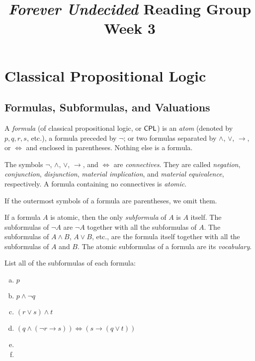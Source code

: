 \documentclass{article}
\title{\textit{Forever Undecided} Reading Group \\ Week 3}
\date{}
\author{}
\begin{document}
\maketitle

\section*{Classical Propositional Logic}

\subsection*{Formulas, Subformulas, and Valuations}

\begin{definition}
    A \textit{formula} (of classical propositional logic, or $\mathsf{CPL}$) is an \textit{atom} (denoted by $p, q, r, s$, etc.), a formula preceded by $\neg$; or two formulas separated by $\wedge$, $\vee$, $\to$, or $\iff$ and enclosed in parentheses. Nothing else is a formula. 
\end{definition}

\begin{definition}    
    The symbols $\neg$, $\wedge$, $\vee$, $\to$, and $\iff$ are \textit{connectives}. They are called \textit{negation}, \textit{conjunction}, \textit{disjunction}, \textit{material implication}, and \textit{material equivalence}, respectively. A formula containing no connectives is \textit{atomic}.
\end{definition}

\begin{notation}
    If the outermost symbols of a formula are parentheses, we omit them.
\end{notation}

\begin{definition}
    If a formula $A$ is atomic, then the only \textit{subformula} of $A$ is $A$ itself. The subformulas of $\neg A$ are $\neg A$ together with all the subformulas of $A$. The subformulas of $A \wedge B$, $A \vee B$, etc., are the formula itself together with all the subformulas of $A$ and $B$. The atomic subformulas of a formula are its \textit{vocabulary}.
\end{definition}

\begin{prob}{3.1}
List all of the subformulas of each formula:
    \begin{multicols}{2}
    \begin{enumerate}[a)]
        \item $p$
        \item $p \wedge \neg q$
        \item $(r \vee s) \wedge t$
        \item $(q \wedge (\neg r \to s)) \iff (s \to (q \vee t))$
        \item
        \item
    \end{enumerate}
    \end{multicols}
\end{prob}
\end{document}
